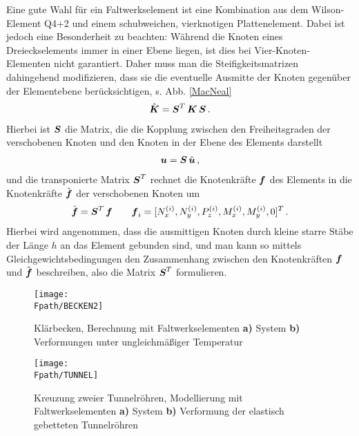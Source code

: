 Eine gute Wahl f\"{u}r ein  Faltwerkselement ist eine Kombination aus dem Wilson-Element Q4+2 und einem schubweichen, vierknotigen Plattenelement. Dabei ist jedoch eine Besonderheit zu beachten: W\"{a}hr\-end die Knoten eines Dreieckselements immer in einer Ebene liegen, ist dies bei Vier-Knoten-Elementen nicht garantiert. Daher muss man die Steifigkeitsmatrizen dahingehend modifizieren, dass sie die eventuelle Ausmitte der Knoten gegen\"{u}ber der Elementebene ber\"{u}cksichtigen, s. Abb. \ref{MacNeal}
\begin{align}
\hat{\mbox{\boldmath $K$}} = \mbox{\boldmath $S$}^T\,\mbox{\boldmath $K$}\,\mbox{\boldmath $S$}\,.
\end{align}
Hierbei ist $\mbox{\boldmath $S$}$ die Matrix, die die Kopplung zwischen den Freiheitsgraden der verschobenen Knoten und den Knoten in der Ebene des Elements darstellt
\begin{align}
\mbox{\boldmath $u$} = \mbox{\boldmath $S$}\,\hat{\mbox{\boldmath $u$}}\,,
\end{align}
und die transponierte Matrix $\mbox{\boldmath $S$}^T$ rechnet die Knotenkr\"{a}fte $\mbox{\boldmath $f$}$ des Elements
in die Knotenkr\"{a}fte $\hat{\mbox{\boldmath $f$}}$ der verschobenen Knoten um
\begin{align}
\hat{\mbox{\boldmath $f$}} = \mbox{\boldmath $S$}^T\,\mbox{\boldmath $f$} \qquad \mbox{\boldmath $f$}_i = [N_x^{(i)}, N_y^{(i)}, P_z^{(i)},
M_x^{(i)}, M_y^{(i)}, 0]^T\,.
\end{align}
Hierbei wird angenommen, dass die ausmittigen Knoten durch kleine starre St\"{a}be der L\"{a}nge $h$ an das Element gebunden sind, und man kann so mittels Gleichgewichtsbedingungen den Zusammenhang zwischen den Knotenkr\"{a}ften $\mbox{\boldmath $f$}$ und $\hat{\mbox{\boldmath $f$}}$ beschreiben, also die Matrix $\mbox{\boldmath $S$}^T$ formulieren.
\begin{figure}[tbp] \centering
\if {} \sidecaption \fi
\texttt{[image: \\Fpath/BECKEN2]}
\caption{Kl\"{a}rbecken, Berechnung mit Faltwerkselementen {\bf a)} System {\bf b)}
Verformungen unter ungleichm\"{a}{\ss}iger Temperatur}  \label{Becken2}
\end{figure}%

\begin{figure}[tbp] \centering
\if {} \sidecaption \fi
\texttt{[image: \\Fpath/TUNNEL]}
\caption{Kreuzung zweier Tunnelr\"{o}hren, Modellierung mit Faltwerkselementen {\bf a)}
System {\bf b)} Verformung der elastisch gebetteten Tunnelr\"{o}hren}  \label{Tunnel}
\end{figure}%

